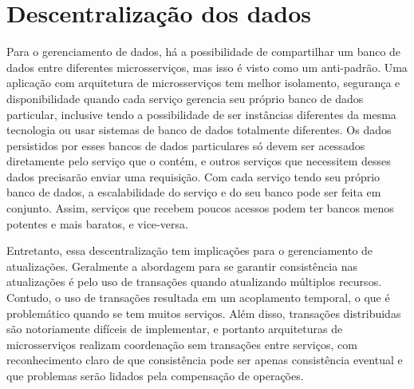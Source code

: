 \section{Descentralização dos dados}

Para o gerenciamento de dados, há a possibilidade de compartilhar um banco de dados entre diferentes microsserviços, mas isso é visto como um anti-padrão. Uma aplicação com arquitetura de microsserviços tem melhor isolamento, segurança e disponibilidade quando cada serviço gerencia seu próprio banco de dados particular, inclusive tendo a possibilidade de ser instâncias diferentes da mesma tecnologia ou usar sistemas de banco de dados totalmente diferentes. Os dados persistidos por esses bancos de dados particulares só devem ser acessados diretamente pelo serviço que o contém, e outros serviços que necessitem desses dados precisarão enviar uma requisição. Com cada serviço tendo seu próprio banco de dados, a escalabilidade do serviço e do seu banco pode ser feita em conjunto. Assim, serviços que recebem poucos acessos podem ter bancos menos potentes e mais baratos, e vice-versa. \cite{oracle_microservices,MartinFowlerMicroservices}

Entretanto, essa descentralização tem implicações para o gerenciamento de atualizações. Geralmente a abordagem para se garantir consistência nas atualizações é pelo uso de transações quando atualizando múltiplos recursos. Contudo, o uso de transações resultada em um acoplamento temporal, o que é problemático quando se tem muitos serviços. Além disso, transações distribuidas são notoriamente difíceis de implementar, e portanto arquiteturas de microsserviços realizam coordenação sem transações entre serviços, com reconhecimento claro de que consistência pode ser apenas consistência eventual e que problemas serão lidados pela compensação de operações. \cite{MartinFowlerMicroservices} 



    
